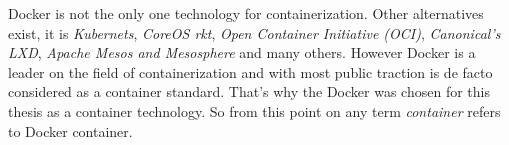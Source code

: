 \documentclass[12pt,a4paper]{article}
\begin{document}
Docker is not the only one technology for containerization. Other alternatives exist, it is \textit{Kubernets}, \textit{CoreOS rkt}, 
\textit{Open Container Initiative (OCI)}, \textit{Canonical's LXD}, \textit{Apache Mesos and Mesosphere} and many others. 
However Docker is a leader on the field of containerization and with most public traction is de facto considered as a container standard.
That's why the Docker was chosen for this thesis as a container technology. So from this point on any term \textit{container} refers to
Docker container.

\begin{figure}[h!]
\centering
\begin{floatrow}
\end{floatrow}
\end{figure}

\begin{figure}[h!]
\centering
\begin{floatrow}
\end{floatrow}
\end{figure}
\end{document}
